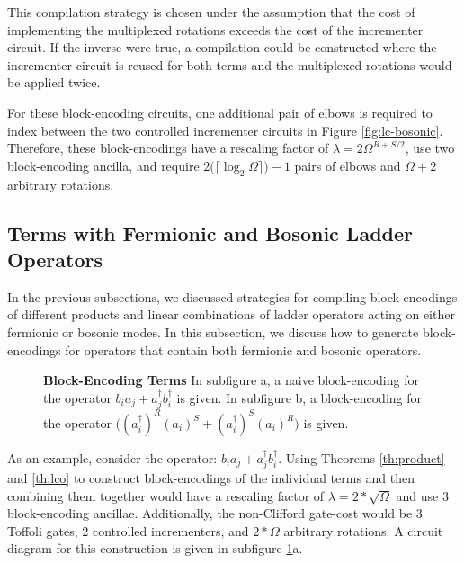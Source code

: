 This compilation strategy is chosen under the assumption that the cost of implementing the multiplexed rotations exceeds the cost of the incrementer circuit.
If the inverse were true, a compilation could be constructed where the incrementer circuit is reused for both terms and the multiplexed rotations would be applied twice.  

For these block-encoding circuits, one additional pair of elbows is required to index between the two controlled incrementer circuits in Figure \ref{fig:lc-bosonic}.
Therefore, these block-encodings have a rescaling factor of $\lambda = 2 \Omega^{R+S/2}$, use two block-encoding ancilla, and require $2\big(\lceil \log_2 \Omega \rceil\big) - 1$ pairs of elbows and $\Omega + 2$ arbitrary rotations.

\subsection{Terms with Fermionic and Bosonic Ladder Operators}

In the previous subsections, we discussed strategies for compiling block-encodings of different products and linear combinations of ladder operators acting on either fermionic or bosonic modes.
In this subsection, we discuss how to generate block-encodings for operators that contain both fermionic and bosonic operators.

\begin{figure}
    
    
    
    \caption{
        \textbf{Block-Encoding Terms}
        In subfigure a, a naive block-encoding for the operator $b_i a_j + a_j^\dagger b_i^\dagger$ is given.
        In subfigure b, a block-encoding for the operator $\big((a_i^\dagger)^R (a_i)^S + (a_i^\dagger)^S (a_i)^R\big)$ is given.
    }
    \label{fig:be-term-example}
\end{figure}


As an example, consider the operator: $b_i a_j + a_j^\dagger b_i^\dagger$.
Using Theorems \ref{th:product} and \ref{th:lco} to construct block-encodings of the individual terms and then combining them together would have a rescaling factor of $\lambda = 2*\sqrt{\Omega}$ and use $3$ block-encoding ancillae.
Additionally, the non-Clifford gate-cost would be $3$ Toffoli gates, 2 controlled incrementers, and $2*\Omega$ arbitrary rotations.
A circuit diagram for this construction is given in subfigure \ref{fig:be-term-example}a.

